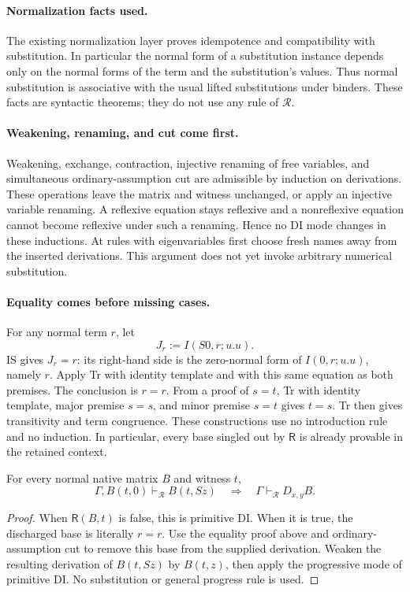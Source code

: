 \paragraph{Normalization facts used.}
The existing normalization layer proves idempotence and compatibility
with substitution.  In particular the normal form of a substitution
instance depends only on the normal forms of the term and the
substitution's values.  Thus normal substitution is associative with
the usual lifted substitutions under binders.  These facts are
syntactic theorems; they do not use any rule of $\mathcal R$.

\paragraph{Weakening, renaming, and cut come first.}
Weakening, exchange, contraction, injective renaming of free variables,
and simultaneous ordinary-assumption cut are admissible by induction on
derivations.  These operations leave the matrix and witness unchanged,
or apply an injective variable renaming.  A reflexive equation stays
reflexive and a nonreflexive equation cannot become reflexive under
such a renaming.  Hence no DI mode changes in these inductions.
At rules with eigenvariables first choose fresh names away from the
inserted derivations.  This argument does not yet invoke arbitrary
numerical substitution.

\paragraph{Equality comes before missing cases.}
For any normal term $r$, let
\[
 J_r:=I(S0,r;u.u).
\]
IS gives $J_r=r$: its right-hand side is the zero-normal form of
$I(0,r;u.u)$, namely $r$.  Apply Tr with identity template and with this
same equation as both premises.  The conclusion is $r=r$.
From a proof of $s=t$, Tr with identity template, major premise $s=s$,
and minor premise $s=t$ gives $t=s$.  Tr then gives transitivity and
term congruence.  These constructions use no introduction rule and no
induction.  In particular, every base singled out by $\mathsf R$ is
already provable in the retained context.

\begin{lemma}
\label{lem:reflexive-all-cases}
For every normal native matrix $B$ and witness $t$,
\[
 \Gamma,B(t,0)\vdash_{\mathcal R}B(t,Sz)
 \quad\Longrightarrow\quad
 \Gamma\vdash_{\mathcal R}D_{x,y}B.
\]
\end{lemma}
\begin{proof}
When $\mathsf R(B,t)$ is false, this is primitive DI.  When it is true,
the discharged base is literally $r=r$.  Use the equality proof above
and ordinary-assumption cut to remove this base from the supplied
derivation.  Weaken the resulting derivation of $B(t,Sz)$ by $B(t,z)$,
then apply the progressive mode of primitive DI.  No substitution or
general progress rule is used.
\end{proof}

